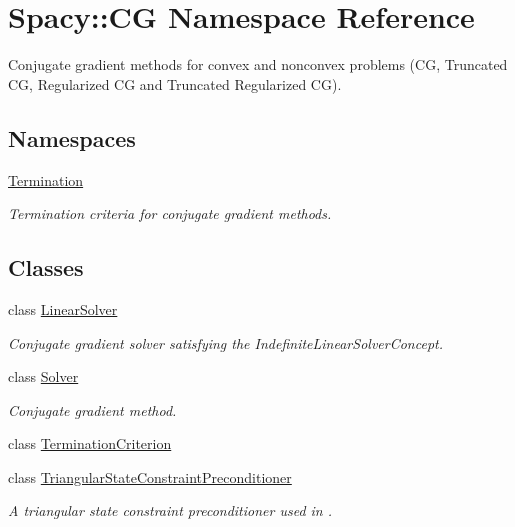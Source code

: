 \hypertarget{namespaceSpacy_1_1CG}{}\section{Spacy\+:\+:C\+G Namespace Reference}
\label{namespaceSpacy_1_1CG}


Conjugate gradient methods for convex and nonconvex problems (C\+G, Truncated C\+G, Regularized C\+G and Truncated Regularized C\+G).  


\subsection*{Namespaces}
\begin{DoxyCompactItemize}
\item 
 \hyperlink{namespaceSpacy_1_1CG_1_1Termination}{Termination}
\begin{DoxyCompactList}\small\item\em Termination criteria for conjugate gradient methods. \end{DoxyCompactList}\end{DoxyCompactItemize}
\subsection*{Classes}
\begin{DoxyCompactItemize}
\item 
class \hyperlink{classSpacy_1_1CG_1_1LinearSolver}{Linear\+Solver}
\begin{DoxyCompactList}\small\item\em Conjugate gradient solver satisfying the Indefinite\+Linear\+Solver\+Concept. \end{DoxyCompactList}\item 
class \hyperlink{classSpacy_1_1CG_1_1Solver}{Solver}
\begin{DoxyCompactList}\small\item\em Conjugate gradient method. \end{DoxyCompactList}\item 
class \hyperlink{classSpacy_1_1CG_1_1TerminationCriterion}{Termination\+Criterion}
\item 
class \hyperlink{classSpacy_1_1CG_1_1TriangularStateConstraintPreconditioner}{Triangular\+State\+Constraint\+Preconditioner}
\begin{DoxyCompactList}\small\item\em A triangular state constraint preconditioner used in \cite{Lubkoll2015a}. \end{DoxyCompactList}\end{DoxyCompactItemize}
